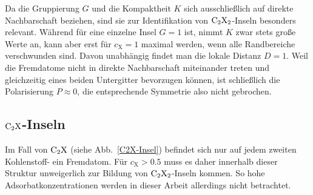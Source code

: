 \documentclass[a4paper, 10pt, twoside, openany]{book} %
\def \cX {c_\mathrm{X}}
\begin{document}
Da die Gruppierung $G$ und die Kompaktheit $K$ sich ausschließlich auf direkte Nachbarschaft beziehen, sind sie zur Identifikation von $\rm C_2X_2$-Inseln besonders relevant. Während für eine einzelne Insel $G = 1$ ist, nimmt $K$ zwar stets große Werte an, kann aber erst für $\cX = 1$ maximal werden, wenn alle Randbereiche verschwunden sind. Davon unabhängig findet man die lokale Distanz $D = 1$. Weil die Fremdatome nicht in direkte Nachbarschaft miteinander treten und gleichzeitig eines beiden Untergitter bevorzugen können, ist schließlich die Polarisierung $P \approx 0$, die entsprechende Symmetrie also nicht gebrochen.

\subsection{$\rm C_2X$-Inseln}

Im Fall von $\rm C_2X$ (siehe Abb.~\ref{C2X-Insel}) befindet sich nur auf jedem zweiten Kohlenstoff- ein Fremdatom. Für $\cX > 0.5$ muss es daher innerhalb dieser Struktur unweigerlich zur Bildung von $\rm C_2X_2$-Inseln kommen. So hohe Adsorbatkonzentrationen werden in dieser Arbeit allerdings nicht betrachtet.
\end{document}
